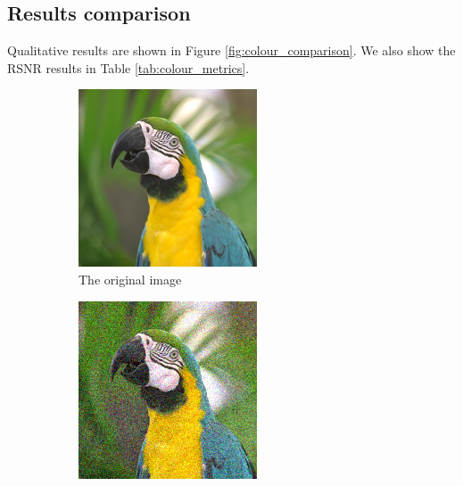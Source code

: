 \documentclass{article}
\begin{document}
\subsection*{Results comparison} \label{sec:results_colour}
Qualitative results are shown in Figure \ref{fig:colour_comparison}. We also show the RSNR results in Table \ref{tab:colour_metrics}.

\begin{figure}[ht]     
    \centering
    \begin{subfigure}[b]{0.24\textwidth}
        \centering
        \includegraphics[width=\textwidth]{images/colour.png}
        \caption{The original image}
        \label{fig:colour}
    \end{subfigure}
    \begin{subfigure}[b]{0.24\textwidth}
        \centering
        \includegraphics[width=\textwidth]{images/noisy_colour.png}

\end{subfigure}
\end{figure}
\end{document}
